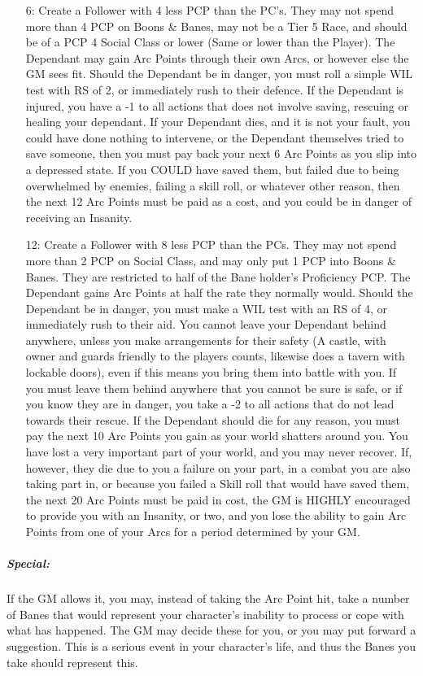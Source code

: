 \documentclass[oneside,11pt,english]{book}
\begin{document}
\begin{itemize}
	\item [6:] Create a Follower with 4 less PCP than the PC’s. They may not spend more than 4 PCP on Boons \& Banes, may not be a Tier 5 Race, and should be of a PCP 4 Social Class or lower (Same or lower than the Player). The Dependant may gain Arc Points through their own Arcs, or however else the GM sees fit. Should the Dependant be in danger, you must roll a simple WIL test with RS of 2, or immediately rush to their defence. If the Dependant is injured, you have a -1 to all actions that does not involve saving, rescuing or healing your dependant. If your Dependant dies, and it is not your fault, you could have done nothing to intervene, or the Dependant themselves tried to save someone, then you must pay back your next 6 Arc Points as you slip into a depressed state. If you COULD have saved them, but failed due to being overwhelmed by enemies, failing a skill roll, or whatever other reason, then the next 12 Arc Points must be paid as a cost, and you could be in danger of receiving an Insanity.
	\item [12:] Create a Follower with 8 less PCP than the PCs. They may not spend more than 2 PCP on Social Class, and may only put 1 PCP into Boons \& Banes. They are restricted to half of the Bane holder’s Proficiency PCP. The Dependant gains Arc Points at half the rate they normally would. Should the Dependant be in danger, you must make a WIL test with an RS of 4, or immediately rush to their aid. You cannot leave your Dependant behind anywhere, unless you make arrangements for their safety (A castle, with owner and guards friendly to the players counts, likewise does a tavern with lockable doors), even if this means you bring them into battle with you. If you must leave them behind anywhere that you cannot be sure is safe, or if you know they are in danger, you take a -2 to all actions that do not lead towards their rescue. If the Dependant should die for any reason, you must pay the next 10 Arc Points you gain as your world shatters around you. You have lost a very important part of your world, and you may never recover. If, however, they die due to you a failure on your part, in a combat you are also taking part in, or because you failed a Skill roll that would have saved them, the next 20 Arc Points must be paid in cost, the GM is HIGHLY encouraged to provide you with an Insanity, or two, and you lose the ability to gain Arc Points from one of your Arcs for a period determined by your GM.\\
\end{itemize}
\subparagraph*{Special:} If the GM allows it, you may, instead of taking the Arc Point hit, take a number of Banes that would represent your character’s inability to process or cope with what has happened. The GM may decide these for you, or you may put forward a suggestion. This is a serious event in your character’s life, and thus the Banes you take should represent this.
\end{document}
